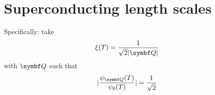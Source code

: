 \documentclass[../notes.tex]{subfiles}
\begin{document}
\raggedbottom
	
\chapter{Superconducting length scales}


Specifically: take
\begin{equation}
	\xi(T) = \frac{1}{\sqrt{2} \vert \vb{Q} \vert}
\end{equation}
with \(\vb{Q}\) such that
\begin{equation}
	\vert \frac{\psi_{\vb{Q}}(T)}{\psi_0 (T)} \vert = \frac{1}{\sqrt{2}}
\end{equation}



	
\end{document}

